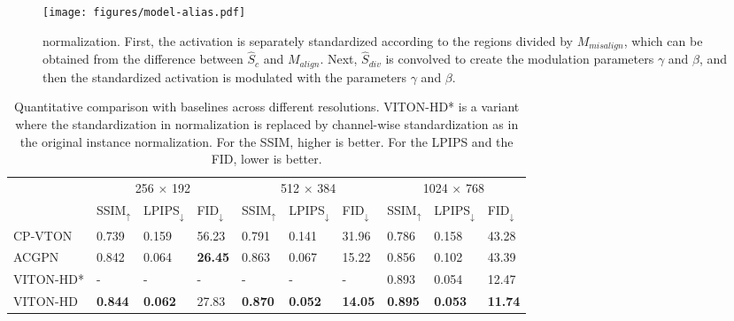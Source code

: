 \begin{figure}[t!]
    \centering
    \texttt{[image: figures/model-alias.pdf]}
    \vspace{-0.5cm}
    \caption{\norm normalization.
    First, the activation is separately standardized according to the regions divided by $M_{misalign}$, which can be obtained from the difference between $\hat{S}_c$ and $M_{align}$.
    Next, $\hat{S}_{div}$ is convolved to create the modulation parameters $\gamma$ and $\beta$, and then the standardized activation is modulated with the parameters $\gamma$ and $\beta$.}
    \vspace{-0.4cm}
    \label{fig:alias norm}
\end{figure}

\begin{table*}[t!]
\centering
\small
\begin{tabular}{@{}p{} p{}<{\centering} p{}<{\centering} p{}<{\centering} | p{}<{\centering} p{}<{\centering} p{}<{\centering} | p{}<{\centering} p{}<{\centering} p{}<{\centering}@{}}
    \toprule
    & \multicolumn{3}{c}{256 $\times$ 192} & \multicolumn{3}{c}{512 $\times$ 384} & \multicolumn{3}{c}{1024 $\times$ 768} \\
    & SSIM$_{\uparrow}$ & LPIPS$_{\downarrow}$ & FID$_{\downarrow}$ & SSIM$_{\uparrow}$ & LPIPS$_{\downarrow}$ & FID$_{\downarrow}$ & SSIM$_{\uparrow}$ & LPIPS$_{\downarrow}$ & FID$_{\downarrow}$ \\
    \midrule
    CP-VTON & 0.739 & 0.159 & 56.23 & 0.791 & 0.141 & 31.96 & 0.786 & 0.158 & 43.28 \\
    ACGPN & 0.842 & 0.064 & \textbf{26.45} & 0.863 & 0.067 & 15.22 & 0.856 & 0.102 & 43.39 \\
    \midrule
    VITON-HD*  & - & - & - & - & - & - & 0.893 & 0.054 & 12.47 \\
    VITON-HD & \textbf{0.844} & \textbf{0.062} & 27.83 & \textbf{0.870} & \textbf{0.052} & \textbf{14.05} & \textbf{0.895} & \textbf{0.053} & \textbf{11.74} \\
    \bottomrule
    \end{tabular}
    \vspace{-0.2cm}
    \caption{Quantitative comparison with baselines across different resolutions. 
    VITON-HD* is a \model variant where the standardization in \norm normalization is replaced by channel-wise standardization as in the original instance normalization.
    For the SSIM, higher is better. For the LPIPS and the FID, lower is better.}
    \label{Table:resolution comparison}
    \vspace{-0.4cm}
\end{table*}

